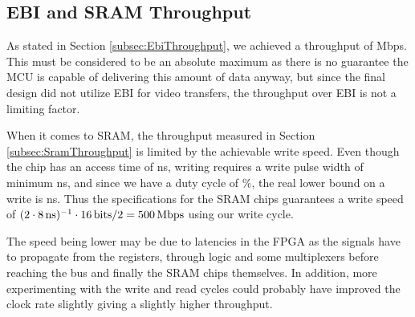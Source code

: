\subsection{EBI and SRAM Throughput}
As stated in Section \ref{subsec:EbiThroughput}, we achieved a throughput of \unit[384]{Mbps}.
This must be considered to be an absolute maximum as there is no guarantee the MCU is capable of delivering this amount of data anyway, but since the final design did not utilize EBI for video transfers, the throughput over EBI is not a limiting factor.

When it comes to SRAM, the throughput measured in Section \ref{subsec:SramThroughput} is limited by the achievable write speed.
Even though the chip has an access time of \unit[10]{ns}, writing requires a write pulse width of minimum \unit[8]{ns}, and since we have a duty cycle of \unit[50]{\%}, the real lower bound on a write is \unit[16]{ns}.
Thus the specifications for the SRAM chips guarantees a write speed of $(2\cdot\unit[8]{ns})^{-1} \cdot \unit[16]{bits} / 2 = \unit[500]{Mbps}$ using our write cycle.

The speed being lower may be due to latencies in the FPGA as the signals have to propagate from the registers, through logic and some multiplexers before reaching the bus and finally the SRAM chips themselves. In addition, more experimenting with the write and read cycles could probably have improved the clock rate slightly giving a slightly higher throughput.
